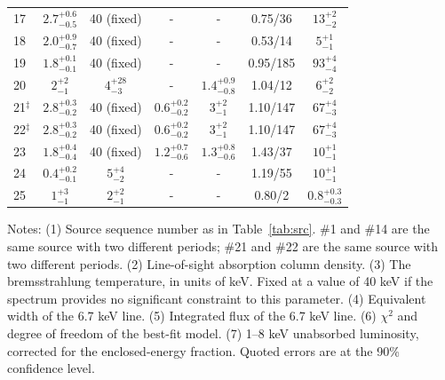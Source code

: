 \documentclass[fleqn,usenatbib]{mnras}
\begin{document}
\begin{table}
\begin{threeparttable}
\begin{spacing}{1.19}
\begin{tabular}{lcccccc}
\\
17 & $2.7^{+0.6}_{-0.5}$ & 40 (fixed)  & - &-&  0.75/36 & $13^{+2}_{-2}$
\\
18 & $2.0^{+0.9}_{-0.7}$ & 40 (fixed)  & -&- &  0.53/14  & $5^{+1}_{-1}$
\\
19 & $1.8^{+0.1}_{-0.1}$ & 40 (fixed)  & - &- &  0.95/185  & $93^{+4}_{-4}$
\\
20 & $2^{+2}_{-1}$ & $4^{+28}_{-3}$ & - &$1.4^{+0.9}_{-0.8}$ & 1.04/12  & $6^{+2}_{-2}$
\\
21$^\ddag$ & $2.8^{+0.3}_{-0.2}$ & 40 (fixed)  & $0.6^{+0.2}_{-0.2}$& 
$3^{+2}_{-1}$ & 1.10/147  & $67^{+4}_{-3}$
\\
22$^\ddag$ & $2.8^{+0.3}_{-0.2}$ & 40 (fixed)  &  $0.6^{+0.2}_{-0.2}$ & $3^{+2}_{-1}$ & 1.10/147  & $67^{+4}_{-3}$
\\
23 & $1.8^{+0.4}_{-0.4}$ & 40 (fixed)  & $1.2^{+0.7}_{-0.6}$  & $1.3^{+0.8}_{-0.6}$ & 1.43/37  & $10^{+1}_{-1}$
\\
24 & $0.4^{+0.2}_{-0.1}$ & $5^{+4}_{-2}$ & - &-&  1.19/55  & 
$10^{+1}_{-1}$
\\
25 & $1^{+3}_{-1}$ & $2^{+2}_{-1}$ &-&-&  0.80/2 & $0.8^{+0.3}_{-0.3}$ 
\\
\hline
\end{tabular}
\end{spacing}
\begin{tablenotes}
      \small
      \item
      Notes: 
      (1) Source sequence number as in Table~\ref{tab:src}. {\dag}\#1 and \#14 are the same source with two different periods; {\ddag}\#21 and \#22 are the same source with two different periods. 
(2) Line-of-sight absorption column density.
(3) The bremsstrahlung temperature, in units of keV. Fixed at a value of 40 keV if the spectrum provides no significant constraint to this parameter.
 (4) Equivalent width of the 6.7 keV line.
 (5) Integrated flux of the 6.7 keV line.
 (6) $\chi^2$ and degree of freedom of the best-fit model.
 (7) 1--8 keV unabsorbed luminosity, corrected for the enclosed-energy fraction. Quoted errors are at the 90\% confidence level.
\end{tablenotes} 
\end{threeparttable}
\end{table} 
 
\end{document}

